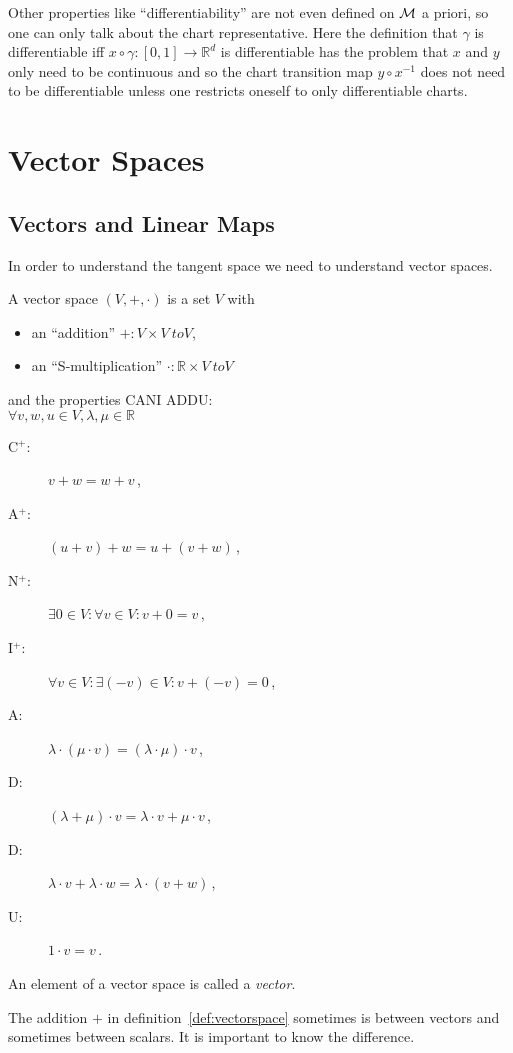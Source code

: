 \documentclass[11pt, a4paper, twocolumn]{article} %
\begin{document}
Other properties like ``differentiability'' are not even defined on $\mathcal{M}$ a priori,
so one can only talk about the chart representative. Here the definition that $\gamma$
is differentiable iff $x\circ\gamma: [0,1]\to\mathbb{R}^{d}$ is differentiable has the
problem that $x$ and $y$ only need to be continuous and so the chart transition map
$y\circ x^{-1}$ does not need to be differentiable unless one restricts oneself to only
differentiable charts.

\section{Vector Spaces}
\subsection{Vectors and Linear Maps}
In order to understand the tangent space we need to understand vector spaces.
\begin{defn}
    \label{def:vectorspace}
    A vector space $(V,+,\cdot)$ is a set $V$ with
    \begin{itemize}
        \item an ``addition'' $+: V\times V \ to V$,
        \item an ``S-multiplication'' $\cdot:\mathbb{R}\times V \ to V$
    \end{itemize}
    and the properties CANI ADDU:\\ $\forall v, w, u \in V, \lambda, \mu \in \mathbb{R}$
    \begin{description}
        \item[C$^+$:] $v + w = w + v$\,,
        \item[A$^+$:] $(u + v) + w = u + (v + w)$\,,
        \item[N$^+$:] $\exists 0 \in V: \forall v \in V: v + 0 = v$\,,
        \item[I$^+$:] $\forall v \in V: \exists(-v)\in V: v + (-v) = 0$\,,
        \item[A:] $\lambda \cdot ( \mu \cdot v) = (\lambda \cdot \mu) \cdot v$\,,
        \item[D:] $(\lambda + \mu)\cdot v = \lambda \cdot v + \mu \cdot v$\,,
        \item[D:] $\lambda \cdot v + \lambda \cdot w = \lambda \cdot (v + w)$\,,
        \item[U:] $ 1 \cdot v = v$\,.
    \end{description}
    An element of a vector space is called a \textit{vector}.
\end{defn}
\begin{note}
The addition $+$ in definition~\ref{def:vectorspace} sometimes is between vectors and sometimes between
scalars. It is important to know the difference.
\end{note}
\end{document}
